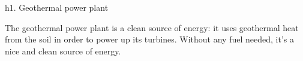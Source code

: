 h1. Geothermal power plant

The geothermal power plant is a clean source of energy: it uses geothermal heat from the soil in order to power up its turbines. Without any fuel needed, it's a nice and clean source of energy.